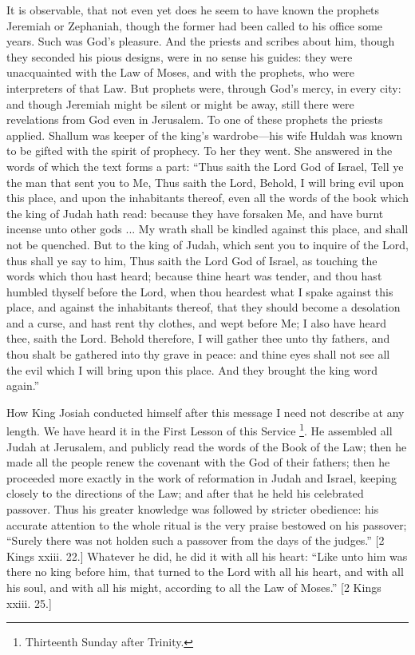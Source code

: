 It is observable, that not even yet does he seem to have known the
prophets Jeremiah or Zephaniah, though the former had been called to
his office some years. Such was God's pleasure. And the priests and
scribes about him, though they seconded his pious designs, were in no
sense his guides: they were unacquainted with the Law of Moses, and
with the prophets, who were interpreters of that Law. But prophets
were, through God's mercy, in every city: and though Jeremiah might be
silent or might be away, still there were revelations from God even in
Jerusalem. To one of these prophets the priests applied. Shallum was
keeper of the king's wardrobe—his wife Huldah was known to be gifted
with the spirit of prophecy. To her they went. She answered in the
words of which the text forms a part: ``Thus saith the Lord God of
Israel, Tell ye the man that sent you to Me, Thus saith the Lord,
Behold, I will bring evil upon this place, and upon the inhabitants
thereof, even all the words of the book which the king of Judah hath
read: because they have forsaken Me, and have burnt incense unto other
gods ... My wrath shall be kindled against this place, and shall not
be quenched. But to the king of Judah, which sent you to inquire of
the Lord, thus shall ye say to him, Thus saith the Lord God of Israel,
as touching the words which thou hast heard; because thine heart was
tender, and thou hast humbled thyself before the Lord, when thou
heardest what I spake against this place, and against the inhabitants
thereof, that they should become a desolation and a curse, and hast
rent thy clothes, and wept before Me; I also have heard thee, saith
the Lord. Behold therefore, I will gather thee unto thy fathers, and
thou shalt be gathered into thy grave in peace: and thine eyes shall
not see all the evil which I will bring upon this place. And they
brought the king word again.''

How King Josiah conducted himself after this message I need not
describe at any length. We have heard it in the First Lesson of this
Service \footnote{Thirteenth Sunday after Trinity.}. He assembled all
Judah at Jerusalem, and publicly read the words of the Book of the
Law; then he made all the people renew the covenant with the God of
their fathers; then he proceeded more exactly in the work of
reformation in Judah and Israel, keeping closely to the directions of
the Law; and after that he held his celebrated passover. Thus his
greater knowledge was followed by stricter obedience: his accurate
attention to the whole ritual is the very praise bestowed on his
passover; ``Surely there was not holden such a passover from the
days of the judges.'' [2 Kings xxiii. 22.] Whatever he did, he did
it with all his heart: ``Like unto him was there no king before
him, that turned to the Lord with all his heart, and with all his
soul, and with all his might, according to all the Law of Moses.''
[2 Kings xxiii. 25.]

